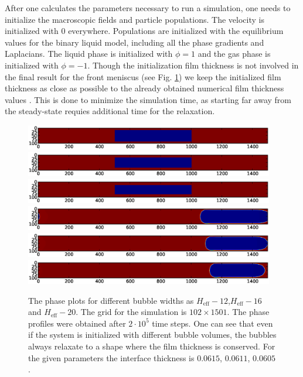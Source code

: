 \documentclass{article}
\begin{document}
After one calculates the parameters necessary to run a simulation, one needs to
initialize the macroscopic fields and particle populations.
The velocity is initialized with $0$ everywhere. Populations are initialized
with the equilibrium values for the binary liquid model, including all the phase
gradients and Laplacians. The liquid phase is initialized with $\phi = 1$ and the
gas phase is initialized with $\phi = -1$. Though the initialization film thickness
is not involved in the final result for the front meniscus (see Fig.
\ref{fig:different:initialization:widths}) we keep the initialized film
thickness as close as possible to the already obtained numerical film
thickness values \cite{giavedoni-numerical}. This is done to minimize
the simulation time, as starting far away from the steady-state requies
additional time for the relaxation.
\begin{figure}
\includegraphics*[bb=-20 360 620 430,width=0.97\textwidth]
{Figures/Init/initbegin12.eps}
\includegraphics*[bb=-20 360 620 430,
width=0.97\textwidth]{Figures/Init/initbegin16.eps}
\includegraphics*[bb=-20 360 620 430,
width=0.97\textwidth]{Figures/Init/initbegin20.eps}
\includegraphics*[bb=-20 360 620
430,width=0.97\textwidth]{Figures/Init/initfinish12.eps}\\
\includegraphics*[bb=-20 360 620
430,width=0.97\textwidth]{Figures/Init/initfinish16.eps}\\
\includegraphics*[bb=-20 360 620
430,width=0.97\textwidth]{Figures/Init/initfinish20.eps}\\
\caption{The phase plots for different bubble widths as
$H_{\mathrm{eff}}-12$,$H_{\mathrm{eff}}-16$ and
$H_{\mathrm{eff}}-20$. The grid for the simulation is $102 \times 1501$. The phase
profiles were obtained after $2\cdot10^5$ time steps. One can see that even if the
system is initialized with different bubble volumes, the bubbles always relaxate
to a shape where the film thickness is conserved. For the given parameters the
interface thickness is $0.0615$, $0.0611$, $0.0605$.
\label{fig:different:initialization:widths}}
\end{figure}
\end{document}
